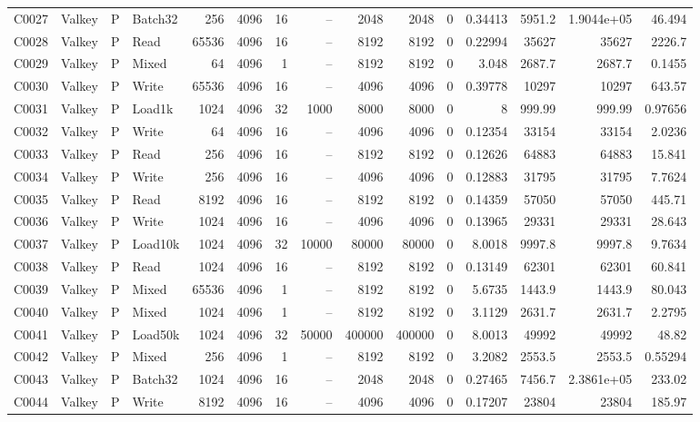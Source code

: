 \begin{landscape}
\begin{longtable}{llllrrrrrrrrrrr}
C0027 & Valkey & P & Batch32 & 256 & 4096 & 16 & -- & 2048 & 2048 & 0 & 0.34413 & 5951.2 & 1.9044e+05 & 46.494\\
C0028 & Valkey & P & Read & 65536 & 4096 & 16 & -- & 8192 & 8192 & 0 & 0.22994 & 35627 & 35627 & 2226.7\\
C0029 & Valkey & P & Mixed & 64 & 4096 & 1 & -- & 8192 & 8192 & 0 & 3.048 & 2687.7 & 2687.7 & 0.1455\\
C0030 & Valkey & P & Write & 65536 & 4096 & 16 & -- & 4096 & 4096 & 0 & 0.39778 & 10297 & 10297 & 643.57\\
C0031 & Valkey & P & Load1k & 1024 & 4096 & 32 & 1000 & 8000 & 8000 & 0 & 8 & 999.99 & 999.99 & 0.97656\\
C0032 & Valkey & P & Write & 64 & 4096 & 16 & -- & 4096 & 4096 & 0 & 0.12354 & 33154 & 33154 & 2.0236\\
C0033 & Valkey & P & Read & 256 & 4096 & 16 & -- & 8192 & 8192 & 0 & 0.12626 & 64883 & 64883 & 15.841\\
C0034 & Valkey & P & Write & 256 & 4096 & 16 & -- & 4096 & 4096 & 0 & 0.12883 & 31795 & 31795 & 7.7624\\
C0035 & Valkey & P & Read & 8192 & 4096 & 16 & -- & 8192 & 8192 & 0 & 0.14359 & 57050 & 57050 & 445.71\\
C0036 & Valkey & P & Write & 1024 & 4096 & 16 & -- & 4096 & 4096 & 0 & 0.13965 & 29331 & 29331 & 28.643\\
C0037 & Valkey & P & Load10k & 1024 & 4096 & 32 & 10000 & 80000 & 80000 & 0 & 8.0018 & 9997.8 & 9997.8 & 9.7634\\
C0038 & Valkey & P & Read & 1024 & 4096 & 16 & -- & 8192 & 8192 & 0 & 0.13149 & 62301 & 62301 & 60.841\\
C0039 & Valkey & P & Mixed & 65536 & 4096 & 1 & -- & 8192 & 8192 & 0 & 5.6735 & 1443.9 & 1443.9 & 80.043\\
C0040 & Valkey & P & Mixed & 1024 & 4096 & 1 & -- & 8192 & 8192 & 0 & 3.1129 & 2631.7 & 2631.7 & 2.2795\\
C0041 & Valkey & P & Load50k & 1024 & 4096 & 32 & 50000 & 400000 & 400000 & 0 & 8.0013 & 49992 & 49992 & 48.82\\
C0042 & Valkey & P & Mixed & 256 & 4096 & 1 & -- & 8192 & 8192 & 0 & 3.2082 & 2553.5 & 2553.5 & 0.55294\\
C0043 & Valkey & P & Batch32 & 1024 & 4096 & 16 & -- & 2048 & 2048 & 0 & 0.27465 & 7456.7 & 2.3861e+05 & 233.02\\
C0044 & Valkey & P & Write & 8192 & 4096 & 16 & -- & 4096 & 4096 & 0 & 0.17207 & 23804 & 23804 & 185.97\\

\end{longtable}
\end{landscape}
